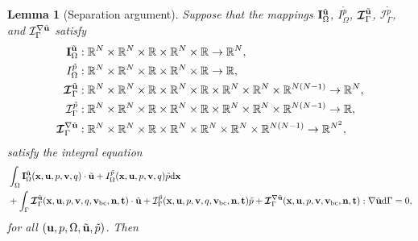 \documentclass[oneside,11pt]{book}
\numberwithin{equation}{section}
\newtheorem{lemma}{Lemma}[section]
\begin{document}
\begin{enumerate}[leftmargin=0mm]
\begin{itemize}[leftmargin=0in]
        \begin{lemma}[Separation argument]
            \label{lemma: separation argument/general stationary Stokes/case 1.2}
            Suppose that the mappings ${\bf I}_\Omega^{\tilde{\bf u}}$, $I_\Omega^{\tilde{p}}$, $\boldsymbol{\mathcal{I}}_\Gamma^{\tilde{\bf u}}$, $\mathcal{I}_\Gamma^{\tilde{p}}$, and $\mathcal{I}_\Gamma^{\nabla\tilde{\bf u}}$ satisfy
            \begin{align*}
                {\bf I}_\Omega^{\tilde{\bf u}}&:\mathbb{R}^N\times\mathbb{R}^N\times\mathbb{R}\times\mathbb{R}^N\times\mathbb{R}\to\mathbb{R}^N,\\
                I_\Omega^{\tilde{p}}&:\mathbb{R}^N\times\mathbb{R}^N\times\mathbb{R}\times\mathbb{R}^N\times\mathbb{R}\to\mathbb{R},\\
                \boldsymbol{\mathcal{I}}_\Gamma^{\tilde{\bf u}}&:\mathbb{R}^N\times\mathbb{R}^N\times\mathbb{R}\times\mathbb{R}^N\times\mathbb{R}\times\mathbb{R}^N\times\mathbb{R}^N\times\mathbb{R}^{N(N-1)}\to\mathbb{R}^N,\\
                \mathcal{I}_\Gamma^{\tilde{p}}&:\mathbb{R}^N\times\mathbb{R}^N\times\mathbb{R}\times\mathbb{R}^N\times\mathbb{R}\times\mathbb{R}^N\times\mathbb{R}^N\times\mathbb{R}^{N(N-1)}\to\mathbb{R},\\
                \boldsymbol{\mathcal{I}}_\Gamma^{\nabla\tilde{\bf u}}&:\mathbb{R}^N\times\mathbb{R}^N\times\mathbb{R}\times\mathbb{R}^N\times\mathbb{R}^N\times\mathbb{R}^N\times\mathbb{R}^{N(N-1)}\to\mathbb{R}^{N^2},
            \end{align*}
            satisfy the integral equation
            \begin{align}
                \label{separation argument/general stationary Stokes/case 1.2/1}
                &\int_\Omega {\bf I}_\Omega^{\tilde{\bf u}}({\bf x},{\bf u},p,{\bf v},q)\cdot\tilde{\bf u} + I_\Omega^{\tilde{p}}({\bf x},{\bf u},p,{\bf v},q)\tilde{p}{\rm d}{\bf x}\nonumber\\
                &+ \int_\Gamma \boldsymbol{\mathcal{I}}_\Gamma^{\tilde{\bf u}}({\bf x},{\bf u},p,{\bf v},q,{\bf v}_{\rm bc},{\bf n},{\bf t})\cdot\tilde{\bf u} + \mathcal{I}_\Gamma^{\tilde{p}}({\bf x},{\bf u},p,{\bf v},q,{\bf v}_{\rm bc},{\bf n},{\bf t})\tilde{p} + \boldsymbol{\mathcal{I}}_\Gamma^{\nabla\tilde{\bf u}}({\bf x},{\bf u},p,{\bf v},{\bf v}_{\rm bc},{\bf n},{\bf t}):\nabla\tilde{\bf u}{\rm d}\Gamma = 0,
            \end{align}
            for all $({\bf u},p,\Omega,\tilde{\bf u},\tilde{p})$. Then
            \begin{equation}

\end{equation}
\end{lemma}
\end{itemize}
\end{enumerate}
\end{document}
